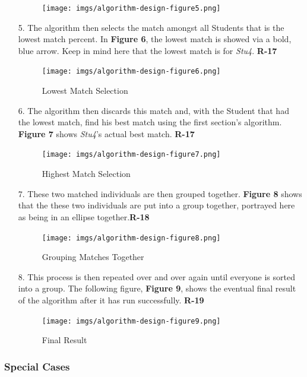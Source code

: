 \documentclass[12pt,letterpaper]{article}
\begin{document}
\begin{enumerate}
\begin{figure}[H]
\begin{center}
		\texttt{[image: imgs/algorithm-design-figure5.png]}
	\end{center}
\end{figure}
	\item[5.] The algorithm then selects the match amongst all Students that is the lowest match percent. In {\bf Figure 6}, the lowest match is showed via a bold, blue arrow. Keep in mind here that the lowest match is for {\it Stu4}. {\bf R-17}
\begin{figure}[H]
	\caption{Lowest Match Selection}
	\begin{center}
		\texttt{[image: imgs/algorithm-design-figure6.png]}
	\end{center}
\end{figure}
	\item[6.] The algorithm then discards this match and, with the Student that had the lowest match, find his best match using the first section's algorithm. {\bf Figure 7} shows {\it Stu4}'s actual best match. {\bf R-17}
\begin{figure}[H]
	\caption{Highest Match Selection}
	\begin{center}
		\texttt{[image: imgs/algorithm-design-figure7.png]}
	\end{center}
\end{figure}
	\item[7.] These two matched individuals are then grouped together. {\bf Figure 8} shows that the these two individuals are put into a group together, portrayed here as being in an ellipse together.{\bf R-18}
\begin{figure}[H]
	\caption{Grouping Matches Together}
	\begin{center}
		\texttt{[image: imgs/algorithm-design-figure8.png]}
	\end{center}
\end{figure}
	\item[8.] This process is then repeated over and over again until everyone is sorted into a group. The following figure, {\bf Figure 9}, shows the eventual final result of the algorithm after it has run successfully. {\bf R-19}
\begin{figure}[H]
	\caption{Final Result}
	\begin{center}
		\texttt{[image: imgs/algorithm-design-figure9.png]}
	\end{center}
\end{figure}

\end{enumerate}
\subsubsection{Special Cases}
\end{document}
